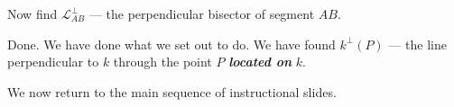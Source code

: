 \documentclass{tufte-handout}
\newcommand{\uvx}{\vspace{.2in}}
\newcommand{\uvxx}{\vspace{.3in}}
\begin{document}
\begin{tcolorbox}
\uvx
  \begin{minipage}{0.65\textwidth}
\end{minipage} \hfill
\begin{minipage}{0.32\textwidth}
\begin{scriptsize}
 Now find $\mathcal{L}_{AB}^{\perp}$ --- the perpendicular bisector of segment $AB.$
 \end{scriptsize}
\end{minipage}


\uvx
  \begin{minipage}{0.65\textwidth}
\end{minipage} \hfill
\begin{minipage}{0.32\textwidth}
\begin{scriptsize}

 Done. We have done what we set out to do. We have found $k^{\perp}(P)$ --- the line perpendicular to $k$ through the point $P$ \textbf{\textit{located on}} $k.$


 \end{scriptsize} 
\end{minipage}

\uvxx
We now return to the main sequence of instructional slides.
\end{tcolorbox}

\pagebreak
\end{document}
